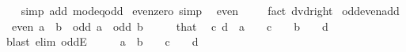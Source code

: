 \begin{isabellebody}
%
\isadelimproof
\ \ %
\endisadelimproof
%
\isatagproof
{}\isamarkupfalse%
\ {\isacharparenleft}{\kern0pt}simp\ add{\isacharcolon}{\kern0pt}\ mod{\isacharunderscore}{\kern0pt}{}{\isacharunderscore}{\kern0pt}eq{\isacharunderscore}{\kern0pt}odd{\isacharparenright}{\kern0pt}%
\endisatagproof
{\isafoldproof}%
%
\isadelimproof
\isanewline
%
\endisadelimproof
\isanewline
{}\isamarkupfalse%
\ even{\isacharunderscore}{\kern0pt}zero\ {\isacharbrackleft}{\kern0pt}simp{\isacharbrackright}{\kern0pt}{\isacharcolon}{\kern0pt}\isanewline
\ \ {\isachardoublequoteopen}even\ {}{\isachardoublequoteclose}\isanewline
%
\isadelimproof
\ \ %
\endisadelimproof
%
\isatagproof
{}\isamarkupfalse%
\ {\isacharparenleft}{\kern0pt}fact\ dvd{\isacharunderscore}{\kern0pt}{}{\isacharunderscore}{\kern0pt}right{\isacharparenright}{\kern0pt}%
\endisatagproof
{\isafoldproof}%
%
\isadelimproof
\isanewline
%
\endisadelimproof
\isanewline
{}\isamarkupfalse%
\ odd{\isacharunderscore}{\kern0pt}even{\isacharunderscore}{\kern0pt}add{\isacharcolon}{\kern0pt}\isanewline
\ \ {\isachardoublequoteopen}even\ {\isacharparenleft}{\kern0pt}a\ {\isacharplus}{\kern0pt}\ b{\isacharparenright}{\kern0pt}{\isachardoublequoteclose}\ \ {\isachardoublequoteopen}odd\ a{\isachardoublequoteclose}\ \ {\isachardoublequoteopen}odd\ b{\isachardoublequoteclose}\isanewline
%
\isadelimproof
%
\endisadelimproof
%
\isatagproof
{}\isamarkupfalse%
\ {\isacharminus}{\kern0pt}\isanewline
\ \ \isamarkupfalse%
\ that\ \isamarkupfalse%
\ c\ d\ \ {\isachardoublequoteopen}a\ {\isacharequal}{\kern0pt}\ {}\ {\isacharasterisk}{\kern0pt}\ c\ {\isacharplus}{\kern0pt}\ {}{\isachardoublequoteclose}\ \ {\isachardoublequoteopen}b\ {\isacharequal}{\kern0pt}\ {}\ {\isacharasterisk}{\kern0pt}\ d\ {\isacharplus}{\kern0pt}\ {}{\isachardoublequoteclose}\isanewline
\ \ \ \ \isamarkupfalse%
\ {\isacharparenleft}{\kern0pt}blast\ elim{\isacharcolon}{\kern0pt}\ oddE{\isacharparenright}{\kern0pt}\isanewline
\ \ \isamarkupfalse%
\ \isamarkupfalse%
\ {\isachardoublequoteopen}a\ {\isacharplus}{\kern0pt}\ b\ {\isacharequal}{\kern0pt}\ {}\ {\isacharasterisk}{\kern0pt}\ c\ {\isacharplus}{\kern0pt}\ {}\ {\isacharasterisk}{\kern0pt}\ d\ {\isacharplus}{\kern0pt}\ {\isacharparenleft}{\kern0pt}{}\ {\isacharplus}{\kern0pt}\ {}{\isacharparenright}{\kern0pt}{\isachardoublequoteclose}\isanewline

\end{isabellebody}
